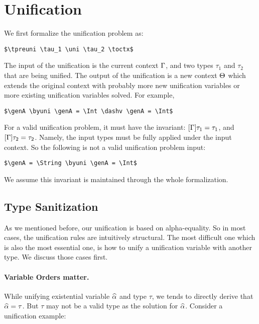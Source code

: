 \section{Unification}
\label{sec:unification}

We first formalize the unification problem as:

\begin{lstlisting}
$\tpreuni \tau_1 \uni \tau_2 \toctx$
\end{lstlisting}

The input of the unification is the current context $\Gamma$, and two types
$\tau_1$ and $\tau_2$ that are being unified. The output of the unification
is a new context $\Theta$ which extends the original context with probably more
new unification variables or more existing
unification variables solved. For example,

\begin{lstlisting}
$\genA \byuni \genA = \Int \dashv \genA = \Int$
\end{lstlisting}

For a valid unification problem, it must have the invariant: $[\Gamma] \tau_1 =
\tau_1$, and $[\Gamma] \tau_2 = \tau_2$. Namely, the input types must be
fully applied under the input context. So the following is not a valid
unification problem input:

\begin{lstlisting}
$\genA = \String \byuni \genA = \Int$
\end{lstlisting}

We assume this invariant is maintained through the whole
formalization.

\subsection{Type Sanitization}

As we mentioned before, our unification is based on alpha-equality. So in most
cases, the unification rules are intuitively structural. The most difficult
one which is also the most essential one, is how to unify a unification variable
with another type. We discuss those cases first.

\paragraph{Variable Orders matter.}

While unifying existential variable $\widehat{\alpha}$ and type $\tau$, we tends to
directly derive that $\widehat{\alpha} = \tau$. But $\tau$ may not be a valid type as the
solution for $\widehat{\alpha}$.
Consider a unification example:

